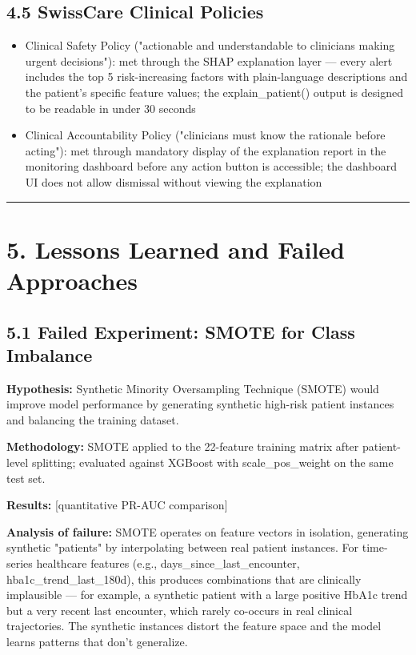 \documentclass[11pt,a4paper]{article}
\begin{document}
\subsection{4.5 SwissCare Clinical Policies}
\begin{itemize}
\item Clinical Safety Policy ("actionable and understandable to clinicians making urgent decisions"): met through the SHAP explanation layer --- every alert includes the top 5 risk-increasing factors with plain-language descriptions and the patient's specific feature values; the explain\_patient() output is designed to be readable in under 30 seconds
\item Clinical Accountability Policy ("clinicians must know the rationale before acting"): met through mandatory display of the explanation report in the monitoring dashboard before any action button is accessible; the dashboard UI does not allow dismissal without viewing the explanation
\end{itemize}

\noindent\rule{\linewidth}{0.4pt}

\section{5. Lessons Learned and Failed Approaches}

\subsection{5.1 Failed Experiment: SMOTE for Class Imbalance}

\textbf{Hypothesis:} Synthetic Minority Oversampling Technique (SMOTE) would improve model performance by generating synthetic high-risk patient instances and balancing the training dataset.

\textbf{Methodology:} SMOTE applied to the 22-feature training matrix after patient-level splitting; evaluated against XGBoost with scale\_pos\_weight on the same test set.

\textbf{Results:} [quantitative PR-AUC comparison]

\textbf{Analysis of failure:} SMOTE operates on feature vectors in isolation, generating synthetic "patients" by interpolating between real patient instances. For time-series healthcare features (e.g., days\_since\_last\_encounter, hba1c\_trend\_last\_180d), this produces combinations that are clinically implausible --- for example, a synthetic patient with a large positive HbA1c trend but a very recent last encounter, which rarely co-occurs in real clinical trajectories. The synthetic instances distort the feature space and the model learns patterns that don't generalize.
\end{document}
